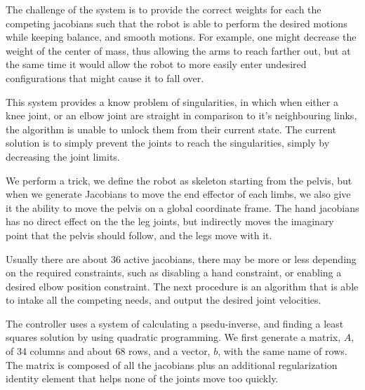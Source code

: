 \documentclass{article}
\begin{document}
The challenge of the system is to provide the correct weights for each the competing jacobians such that the robot is able to perform the desired motions while keeping balance, and smooth motions. For example, one might decrease the weight of the center of mass, thus allowing the arms to reach farther out, but at the same time it would allow the robot to more easily enter undesired configurations that might cause it to fall over.

This system provides a know problem of singularities, in which when either a knee joint, or an elbow joint are straight in comparison to it's neighbouring links, the algorithm is unable to unlock them from their current state. The current solution is to simply prevent the joints to reach the singularities, simply by decreasing the joint limits. 

We perform a trick, we define the robot as skeleton starting from the pelvis, but when we generate Jacobians to move the end effector of each limbs, we also give it the ability to move the pelvis on a global coordinate frame. The hand jacobians has no direct effect on the the leg joints, but indirectly moves the imaginary point that the pelvis should follow, and the legs move with it. 

Usually there are about 36 active jacobians, there may be more or less depending on the required constraints, such as disabling a hand constraint, or enabling a desired elbow position constraint. The next procedure is an algorithm that is able to intake all the competing needs, and output the desired joint velocities. 

The controller uses a system of calculating a psedu-inverse, and finding a least squares solution by using quadratic programming. We first generate a matrix, $A$, of 34 columns and about 68 rows, and a vector, $b$, with the same name of rows. The matrix is composed of all the jacobians plus an additional regularization identity element that helps none of the joints move too quickly. 
\end{document}
